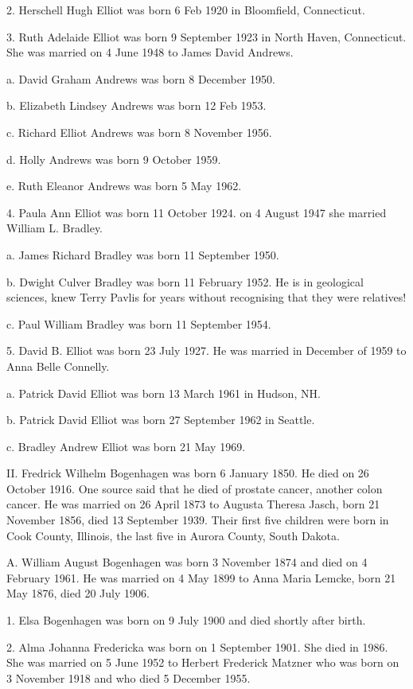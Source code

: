 \documentclass[a4paper]{article}
\begin{document}
2. Herschell Hugh Elliot was born 6 Feb 1920 in Bloomfield, Connecticut.

3. Ruth Adelaide Elliot was born 9 September 1923 in North Haven, Connecticut. She was married on 4 June 1948 to James David Andrews.
 
a. David Graham Andrews was born 8 December 1950.

b. Elizabeth Lindsey Andrews was born 12 Feb 1953.

c. Richard Elliot Andrews was born 8 November 1956.

d. Holly Andrews was born 9 October 1959.

e. Ruth Eleanor Andrews was born 5 May 1962.

4. Paula Ann Elliot was born 11 October 1924.  on 4 August 1947 she married William L. Bradley.

a. James Richard Bradley was born 11 September 1950.

b. Dwight Culver Bradley was born 11 February 1952.  He is in geological sciences,  knew Terry Pavlis for years without recognising that they were relatives!

c. Paul William Bradley was born 11 September 1954.

5. David B. Elliot was born 23 July 1927.  He was married in December of 1959 to Anna Belle Connelly.

a. Patrick David Elliot was born 13 March 1961 in Hudson, NH.

b. Patrick David Elliot was born 27 September 1962 in Seattle.

c. Bradley Andrew Elliot was born 21 May 1969.

II. Fredrick Wilhelm Bogenhagen was born 6 January 1850.  He died on 26 October 1916. One source said that he died of prostate cancer, another colon cancer.  He was married on 26 April 1873 to Augusta Theresa Jasch, born 21 November 1856, died 13 September 1939.  Their first five children were born in Cook County, Illinois, the last five in Aurora County, South Dakota.

A. William August Bogenhagen was born 3 November 1874 and died on 4 February 1961.  	He was married on 4 May 1899 to Anna Maria Lemcke, born 21 May 1876, died 20 July 1906.

1. Elsa Bogenhagen was born on 9 July 1900 and died shortly after birth.

2. Alma Johanna Fredericka was born on 1 September 1901. She died in 1986. She was married on 5 June 1952 to Herbert Frederick Matzner who was born on 3 November 1918 and who died 5 December 1955.
\end{document}
